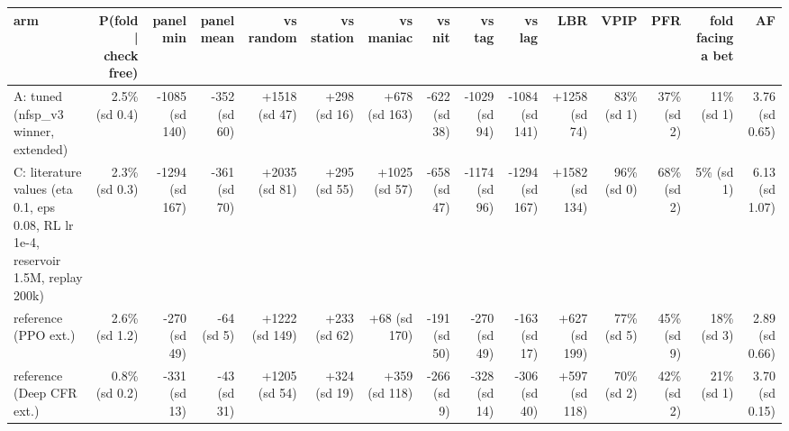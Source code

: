 \begin{tabular}{lrrrrrrrrrrrrrr}
\toprule
arm & P(fold | check free) & panel min & panel mean & vs random & vs station & vs maniac & vs nit & vs tag & vs lag & LBR & VPIP & PFR & fold facing a bet & AF \\
\midrule
A: tuned (nfsp\_v3 winner, extended) & 2.5\% (sd 0.4) & -1085 (sd 140) & -352 (sd 60) & +1518 (sd 47) & +298 (sd 16) & +678 (sd 163) & -622 (sd 38) & -1029 (sd 94) & -1084 (sd 141) & +1258 (sd 74) & 83\% (sd 1) & 37\% (sd 2) & 11\% (sd 1) & 3.76 (sd 0.65) \\
C: literature values (eta 0.1, eps 0.08, RL lr 1e-4, reservoir 1.5M, replay 200k) & 2.3\% (sd 0.3) & -1294 (sd 167) & -361 (sd 70) & +2035 (sd 81) & +295 (sd 55) & +1025 (sd 57) & -658 (sd 47) & -1174 (sd 96) & -1294 (sd 167) & +1582 (sd 134) & 96\% (sd 0) & 68\% (sd 2) & 5\% (sd 1) & 6.13 (sd 1.07) \\
reference (PPO ext.) & 2.6\% (sd 1.2) & -270 (sd 49) & -64 (sd 5) & +1222 (sd 149) & +233 (sd 62) & +68 (sd 170) & -191 (sd 50) & -270 (sd 49) & -163 (sd 17) & +627 (sd 199) & 77\% (sd 5) & 45\% (sd 9) & 18\% (sd 3) & 2.89 (sd 0.66) \\
reference (Deep CFR ext.) & 0.8\% (sd 0.2) & -331 (sd 13) & -43 (sd 31) & +1205 (sd 54) & +324 (sd 19) & +359 (sd 118) & -266 (sd 9) & -328 (sd 14) & -306 (sd 40) & +597 (sd 118) & 70\% (sd 2) & 42\% (sd 2) & 21\% (sd 1) & 3.70 (sd 0.15) \\
\bottomrule
\end{tabular}
